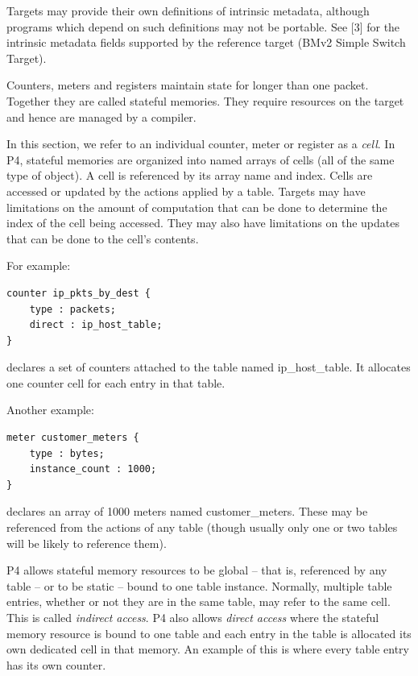 \documentclass[12pt]{article}
\begin{document}
Targets may provide their own definitions of intrinsic metadata, although 
programs which depend on such definitions may not be portable. 
See [3] for the intrinsic metadata fields supported by the reference target (BMv2 Simple Switch Target).


Counters, meters and registers maintain state for longer than one packet. 
Together they are called stateful memories. They require resources on the 
target and hence are managed by a compiler.

In this section, we refer to an individual counter, meter or register as a 
\textit{cell}. In P4, stateful memories are organized into named arrays of cells 
(all of the same type of object). A cell is referenced by its array name and 
index. Cells are accessed or updated by the actions applied by a table. Targets 
may have limitations on the amount of computation that can be done to determine 
the index of the cell being accessed.  They may also have limitations on 
the updates that can be done to the cell's contents.

For example:

\begin{lstlisting}[keywords={},frame=single,escapechar=\@]
counter ip_pkts_by_dest {
    type : packets;
    direct : ip_host_table;
}
\end{lstlisting}


declares a set of counters attached to the table named ip_host_table. It 
allocates one counter cell for each entry in that table.

Another example:

\begin{lstlisting}[keywords={},frame=single,escapechar=\@]
meter customer_meters {
    type : bytes;
    instance_count : 1000;
}
\end{lstlisting}


declares an array of 1000 meters named customer_meters. These may be referenced 
from the actions of any table (though usually only one or two tables will 
be likely to reference them).

P4 allows stateful memory resources to be global -- that is, referenced by 
any table -- or to be static -- bound to one table instance. Normally, multiple 
table entries, whether or not they are in the same table, may refer to the 
same cell. This is called \textit{indirect access}. P4 also allows \textit{direct access} where 
the stateful memory resource is bound to one table and each entry in the table 
is allocated its own dedicated cell in that memory. An example of this is 
where every table entry has its own counter.
\end{document}
